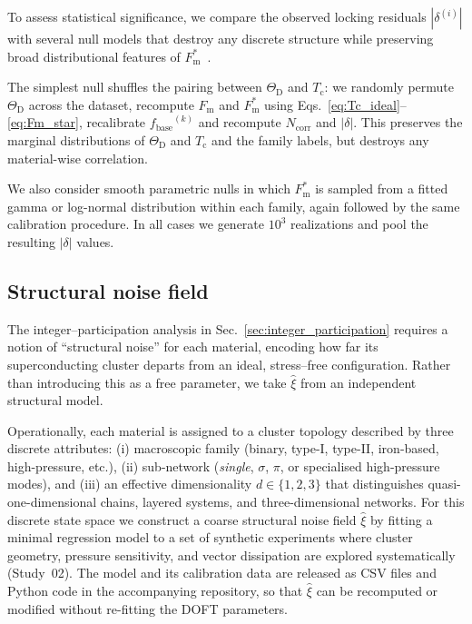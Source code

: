 \documentclass[aps,prb,twocolumn,superscriptaddress,floatfix,nofootinbib]{revtex4-2}
\newcommand{\Tc}{\ensuremath{T_{\mathrm{c}}}}
\newcommand{\ThetaD}{\ensuremath{\Theta_{\mathrm{D}}}}
\newcommand{\Fm}{\ensuremath{F_{\mathrm{m}}}}
\newcommand{\Fmstar}{\ensuremath{{F_{\mathrm{m}}^{\ast}}}}
\newcommand{\fbase}{\ensuremath{{f_{\mathrm{base}}}}}
\newcommand{\Ncorr}{\ensuremath{{N_{\mathrm{corr}}}}}
\newcommand{\deltalock}{\ensuremath{\delta}}
\begin{document}
To assess statistical significance, we compare the observed
locking residuals $|\deltalock^{(i)}|$ with several null models
that destroy any discrete structure while preserving
broad distributional features of $\Fmstar$~\cite{Efron1993}.

The simplest null shuffles the pairing between $\ThetaD$ and $\Tc$:
we randomly permute $\ThetaD$ across the dataset, recompute
$\Fm$ and $\Fmstar$ using Eqs.~\eqref{eq:Tc_ideal}--\eqref{eq:Fm_star},
recalibrate $\fbase^{(k)}$ and recompute $\Ncorr$ and $|\deltalock|$.
This preserves the marginal distributions of $\ThetaD$ and $\Tc$
and the family labels, but destroys any material-wise correlation.

We also consider smooth parametric nulls in which $\Fmstar$
is sampled from a fitted gamma or log-normal distribution within
each family, again followed by the same calibration procedure.
In all cases we generate $10^3$ realizations and pool the resulting
$|\deltalock|$ values.

\subsection{Structural noise field}\label{sec:structural_noise}

The integer–participation analysis in Sec.~\ref{sec:integer_participation}
requires a notion of ``structural noise'' for each material, encoding how far
its superconducting cluster departs from an ideal, stress–free configuration.
Rather than introducing this as a free parameter, we take \(\hat\xi\) from an
independent structural model.

Operationally, each material is assigned to a cluster topology described by
three discrete attributes: (i) macroscopic family (binary, type-I, type-II,
iron-based, high-pressure, etc.), (ii) sub-network (\textit{single}, \(\sigma\),
\(\pi\), or specialised high-pressure modes), and (iii) an effective
dimensionality \(d\in\{1,2,3\}\) that distinguishes quasi-one-dimensional
chains, layered systems, and three-dimensional networks. For this discrete
state space we construct a coarse structural noise field \(\hat\xi\) by
fitting a minimal regression model to a set of synthetic experiments where
cluster geometry, pressure sensitivity, and vector dissipation are explored
systematically (Study~02). The model and its calibration data are released as
CSV files and Python code in the accompanying repository, so that
\(\hat\xi\) can be recomputed or modified without re-fitting the DOFT
parameters.
\end{document}
